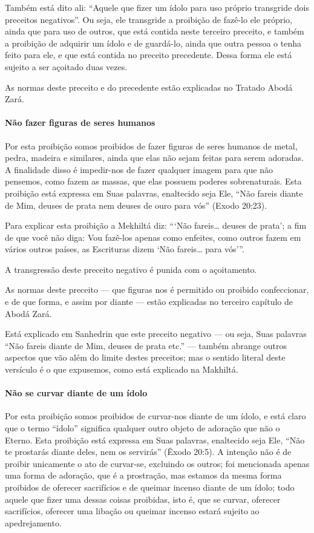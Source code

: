 Também está dito ali: ``Aquele que fizer um ídolo para uso próprio
transgride dois preceitos negativos''. Ou seja, ele transgride a
proibição de fazê-lo ele próprio, ainda que para uso de outros, que está
contida neste terceiro preceito, e também a proibição de adquirir um
ídolo e de guardá-lo, ainda que outra pessoa o tenha feito para ele, e
que está contida no preceito precedente. Dessa forma ele está sujeito a
ser açoitado duas vezes.

As normas deste preceito e do precedente estão explicadas no Tratado
Abodá Zará.

\paragraph{Não fazer figuras de seres humanos}

Por esta proibição somos proibidos de fazer figuras de seres humanos de
metal, pedra, madeira e similares, ainda que elas não sejam feitas para
serem adoradas. A finalidade disso é impedir-nos de fazer qualquer
imagem para que não pensemos, como fazem as massas, que elas possuem
poderes sobrenaturais. Esta proibição está expressa em Suas palavras,
enaltecido seja Ele, ``Não fareis diante de Mim, deuses de prata nem
deuses de ouro para vós'' (Exodo 20:23).

Para explicar esta proibição a Mekhiltá diz: ```Não fareis\ldots{} deuses de
prata'; a fim de que você não diga: Vou fazê-los apenas como enfeites,
como outros fazem em vários outros países, as Escrituras dizem `Não
fareis\ldots{} para vós'''.

A transgressão deste preceito negativo é punida com o açoitamento.

As normas deste preceito --- que figuras nos é permitido ou proibido
confeccionar, e de que forma, e assim por diante --- estão explicadas no
terceiro capítulo de Abodá Zará.

Está explicado em Sanhedrin que este preceito negativo --- ou seja, Suas
palavras ``Não fareis diante de Mim, deuses de prata etc.'' --- também
abrange outros aspectos que vão além do limite destes preceitos; mas o
sentido literal deste versículo é o que expusemos, como está explicado
na Makhiltá.

\paragraph{Não se curvar diante de um ídolo}

Por esta proibição somos proibidos de curvar-nos diante de um ídolo, e
está claro que o termo ``ídolo'' significa qualquer outro objeto de
adoração que não o Eterno. Esta proibição está expressa em Suas
palavras, enaltecido seja Ele, ``Não te prostarás diante deles, nem os
servirás'' (Êxodo 20:5). A intenção não é de proibir unicamente o ato de
curvar-se, excluindo os outros; foi mencionada apenas uma forma de
adoração, que é a prostração, mas estamos da mesma forma proibidos de
oferecer sacrifícios e de queimar incenso diante de um ídolo; todo
aquele que fizer uma dessas coisas proibidas, isto é, que se curvar,
oferecer sacrifícios, oferecer uma libação ou queimar incenso estará
sujeito ao apedrejamento.

